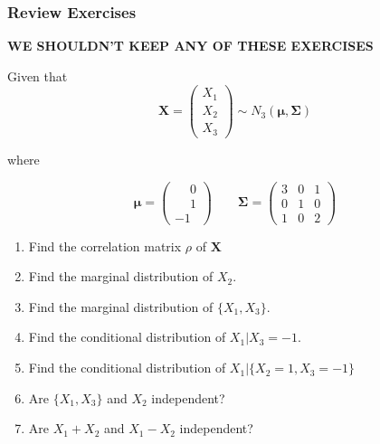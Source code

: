 \documentclass{beamer}
\begin{document}
\begin{frame}
\frametitle{Review Exercises}
\textbf{WE SHOULDN'T KEEP ANY OF THESE EXERCISES}

Given that 
$$\mathbf{X} =  
\begin{pmatrix}
X_1\\
X_2\\
X_3
\end{pmatrix}
\sim N_3(\mathbf{\mu}, \mathbf{\Sigma}) 
$$

where

$$\mathbf{\mu} = 
\begin{pmatrix}
\phantom{-}0\\
\phantom{-}1\\
-1
\end{pmatrix}
\qquad 
\mathbf{\Sigma} =  
\begin{pmatrix}
3 & 0 & 1\\
0 & 1 & 0\\
1 & 0 & 2
\end{pmatrix}
$$

\begin{enumerate}

\item Find the correlation matrix $\rho$ of $\mathbf{X}$\\
\item Find the marginal distribution of $X_2$.\\

\item Find the marginal distribution of $\{X_1, X_3\}$.\\

\item Find the conditional distribution of $X_1|X_3 = -1$.\\

\item Find the conditional distribution of $X_1|\{X_2 = 1, X_3 = -1\}$\\

\item Are $\{X_1, X_3\}$ and $X_2$ independent?\\

\item Are $X_1 + X_2$ and $X_1 - X_2$ independent?\\  
\end{enumerate}

\end{frame}
\end{document}
